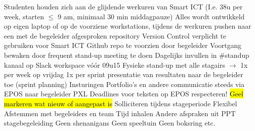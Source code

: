 \begin{outline}
  \1 Studenten houden zich aan de glijdende werkuren van Smart ICT (I.e. 38u per week, starten $\leq$ 9 am, minimaal 30 min middagpauze)
  \1 Alles wordt ontwikkeld op eigen laptop of op de voorziene workstations, tijdens de werkuren pushen naar een met de begeleider afgesproken repository
    \2 Version Control verplicht te gebruiken voor Smart ICT
    \2 Github repo te voorzien door begeleider
  \1 Voortgang bewaken door frequent stand-up meeting te doen
    \2 Dagelijks invullen in \#standup kanaal op Slack workspace vóór 09u15
    \2 Fysieke stand-up met alle stagairs $\rightarrow$ 1x per week op vrijdag
  \1 1x per sprint presentatie van resultaten naar de begeleider toe (sprint planning)
  \1 Insturingen
    \2 Portfolio’s en andere communicatie steeds via EPOS naar begeleider PXL
    \2 Deadlines voor teksten op EPOS respecteren!
    \2 \hl{Geel markeren wat nieuw of aangepast is}
  \1 Solliciteren tijdens stageperiode
    \2 Flexibel
    \2 Afstemmen met begeleiders en team
    \2 Tijd inhalen
    \2 Andere afspraken uit PPT stagebegeleiding
  \1 Geen shenanigans
    \2 Geen speeltuin
    \2 Geen boksring
    \2 etc.
\end{outline}